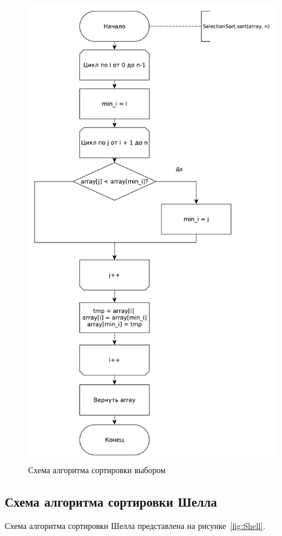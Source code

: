 \documentclass[12pt]{report}
\begin{document}
    \begin{figure}[H]
        \centering
        \includegraphics[width=0.8\linewidth]{img/SelectionSort}
        \caption{Схема алгоритма сортировки выбором}
        \label{fig:Selection}
    \end{figure}

    \subsection{Схема алгоритма сортировки Шелла}
    Схема алгоритма сортировки Шелла представлена на рисунке~\ref{fig:Shell}.
\end{document}
